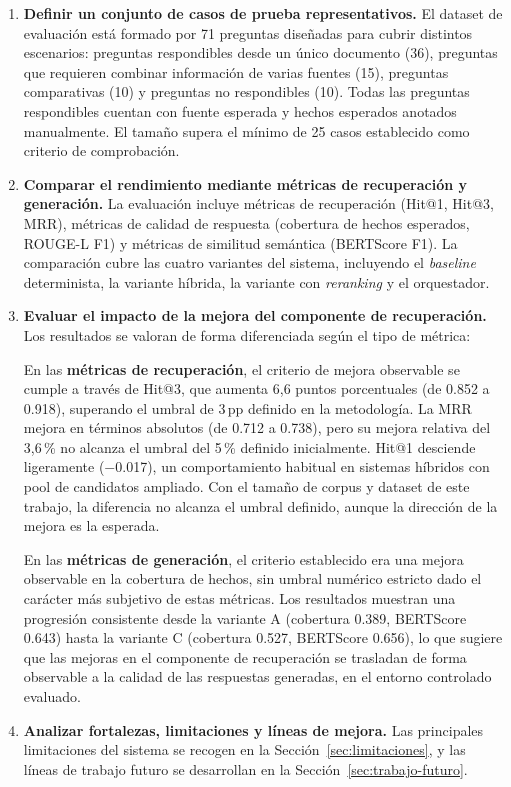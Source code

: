 \begin{enumerate}
    \item \textbf{Definir un conjunto de casos de prueba representativos.} El dataset de evaluación está formado por 71 preguntas diseñadas para cubrir distintos escenarios: preguntas respondibles desde un único documento (36), preguntas que requieren combinar información de varias fuentes (15), preguntas comparativas (10) y preguntas no respondibles (10). 
    Todas las preguntas respondibles cuentan con fuente esperada y hechos esperados anotados manualmente. El tamaño supera el mínimo de 25 casos establecido como criterio de comprobación. 

    \item \textbf{Comparar el rendimiento mediante métricas de recuperación y generación.} La evaluación incluye métricas de recuperación (Hit@1, Hit@3, MRR), métricas de calidad de respuesta (cobertura de hechos esperados, ROUGE-L F1) y métricas de similitud semántica (BERTScore F1). 
    La comparación cubre las cuatro variantes del sistema, incluyendo el \textit{baseline} determinista, la variante híbrida, la variante con \textit{reranking} y el orquestador. 

    \item \textbf{Evaluar el impacto de la mejora del componente de recuperación.} Los resultados se valoran de forma diferenciada según el tipo de métrica:

    En las \textbf{métricas de recuperación}, el criterio de mejora observable se cumple a través de Hit@3, que aumenta 6,6 puntos porcentuales (de 0.852 a 0.918), superando el umbral de 3\,pp definido en la metodología. La MRR mejora en términos absolutos (de 0.712 a 0.738), pero su mejora relativa del 3,6\,\% no alcanza el umbral del 5\,\% definido inicialmente. Hit@1 desciende ligeramente ($-$0.017), un comportamiento habitual en sistemas híbridos con pool de candidatos ampliado. Con el tamaño de corpus y dataset de este trabajo, la diferencia no alcanza el umbral definido, aunque la dirección de la mejora es la esperada.

    En las \textbf{métricas de generación}, el criterio establecido era una mejora observable en la cobertura de hechos, sin umbral numérico estricto dado el carácter más subjetivo de estas métricas. Los resultados muestran una progresión consistente desde la variante A (cobertura 0.389, BERTScore 0.643) hasta la variante C (cobertura 0.527, BERTScore 0.656), lo que sugiere que las mejoras en el componente de recuperación se trasladan de forma observable a la calidad de las respuestas generadas, en el entorno controlado evaluado.

    \item \textbf{Analizar fortalezas, limitaciones y líneas de mejora.} Las principales limitaciones del sistema se recogen en la Sección~\ref{sec:limitaciones}, y las líneas de trabajo futuro se desarrollan en la Sección~\ref{sec:trabajo-futuro}.
\end{enumerate}

